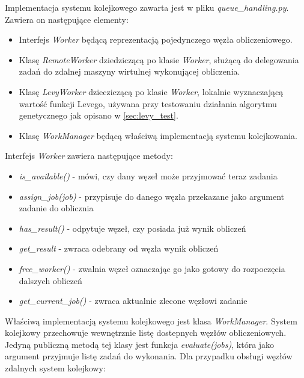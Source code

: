Implementacja systemu kolejkowego zawarta jest w pliku \textit{queue\_handling.py}.
Zawiera on następujące elementy:

\begin{itemize}
  \item Interfejs \textit{Worker} będącą reprezentacją pojedynczego węzła obliczeniowego.
  \item Klasę \textit{RemoteWorker} dziedziczącą po klasie \textit{Worker}, służącą do delegowania zadań do zdalnej maszyny wirtulnej wykonującej obliczenia.
  \item Klasę \textit{LevyWorker} dziecziczącą po klasie \textit{Worker}, lokalnie wyznaczającą wartość funkcji Levego, używana przy testowaniu działania algorytmu genetycznego jak opisano w \ref{sec:levy_test}.
  \item Klasę \textit{WorkManager} będącą właściwą implementacją systemu kolejkowania.
\end{itemize}

Interfejs \textit{Worker} zawiera następujące metody:
\begin{itemize}
  \item \textit{is\_available()} - mówi, czy dany węzeł może przyjmować teraz zadania
  \item \textit{assign\_job(job)} - przypisuje do danego węzła przekazane jako argument zadanie do oblicznia
  \item \textit{has\_result()} - odpytuje węzeł, czy posiada już wynik obliczeń
  \item \textit{get\_result{}} - zwraca odebrany od węzła wynik obliczeń
  \item \textit{free\_worker()} - zwalnia węzeł oznaczając go jako gotowy do rozpoczęcia dalszych obliczeń
  \item \textit{get\_current\_job()} - zwraca aktualnie zlecone węzłowi zadanie
\end{itemize}

Właściwą implementacją systemu kolejkowego jest klasa \textit{WorkManager}.
System kolejkowy przechowuje wewnętrznie listę dostepnych węzłów obliczeniowych.
Jedyną publiczną metodą tej klasy jest funkcja \textit{evaluate(jobs)}, która jako argument przyjmuje listę zadań do wykonania.
Dla przypadku obsługi węzłów zdalnych system kolejkowy:

